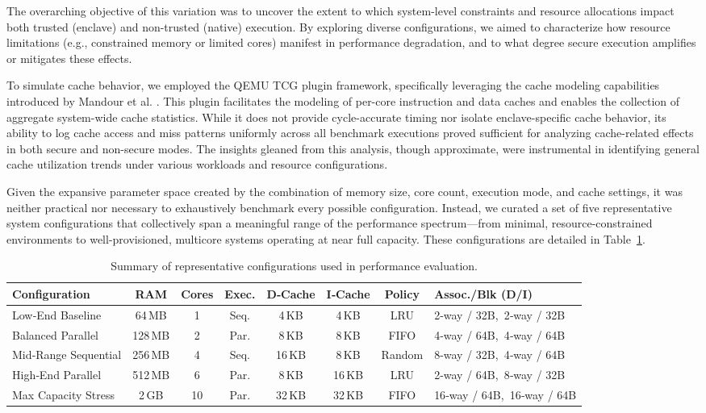 The overarching objective of this variation was to uncover the extent to which system-level constraints and resource allocations impact both trusted (enclave) and non-trusted (native) execution. By exploring diverse configurations, we aimed to characterize how resource limitations (e.g., constrained memory or limited cores) manifest in performance degradation, and to what degree secure execution amplifies or mitigates these effects.

To simulate cache behavior, we employed the QEMU TCG plugin framework, specifically leveraging the cache modeling capabilities introduced by Mandour et al. \cite{mandour2021cache}. This plugin facilitates the modeling of per-core instruction and data caches and enables the collection of aggregate system-wide cache statistics. While it does not provide cycle-accurate timing nor isolate enclave-specific cache behavior, its ability to log cache access and miss patterns uniformly across all benchmark executions proved sufficient for analyzing cache-related effects in both secure and non-secure modes. The insights gleaned from this analysis, though approximate, were instrumental in identifying general cache utilization trends under various workloads and resource configurations.

Given the expansive parameter space created by the combination of memory size, core count, execution mode, and cache settings, it was neither practical nor necessary to exhaustively benchmark every possible configuration. Instead, we curated a set of five representative system configurations that collectively span a meaningful range of the performance spectrum—from minimal, resource-constrained environments to well-provisioned, multicore systems operating at near full capacity. These configurations are detailed in Table~\ref{tab:configurations}.

\begin{table}[h]
\centering
\footnotesize
\setlength{\tabcolsep}{5pt}
\renewcommand{\arraystretch}{1.2}
\begin{tabular}{|l|c|c|c|c|c|c|l|}
\hline
\textbf{Configuration} & \textbf{RAM} & \textbf{Cores} & \textbf{Exec.} &
\textbf{D‑Cache} & \textbf{I‑Cache} & \textbf{Policy} & \textbf{Assoc./Blk (D/I)} \\
\hline
Low‑End Baseline &
64\,MB & 1 & Seq. &
4\,KB & 4\,KB & LRU & 2‑way / 32B,\ 2‑way / 32B \\
\hline
Balanced Parallel &
128\,MB & 2 & Par. &
8\,KB & 8\,KB & FIFO & 4‑way / 64B,\ 4‑way / 64B \\
\hline
Mid‑Range Sequential &
256\,MB & 4 & Seq. &
16\,KB & 8\,KB & Random & 8‑way / 32B,\ 4‑way / 64B \\
\hline
High‑End Parallel &
512\,MB & 6 & Par. &
8\,KB & 16\,KB & LRU & 2‑way / 64B,\ 8‑way / 32B \\
\hline
Max Capacity Stress &
2\,GB & 10 & Par. &
32\,KB & 32\,KB & FIFO & 16‑way / 64B,\ 16‑way / 64B \\
\hline
\end{tabular}
\caption{Summary of representative configurations used in performance evaluation.}
\label{tab:configurations}
\end{table}

